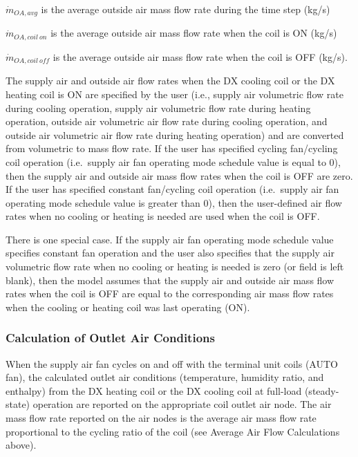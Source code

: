 \(\dot{m}_{OA,avg}\) is the average outside air mass flow rate during the time step (kg/s)

\(\dot{m}_{OA,coil~on}\) is the average outside air mass flow rate when the coil is ON (kg/s)

\(\dot{m}_{OA,coil~off}\) is the average outside air mass flow rate when the coil is OFF (kg/s).

The supply air and outside air flow rates when the DX cooling coil or the DX heating coil is ON are specified by the user (i.e., supply air volumetric flow rate during cooling operation, supply air volumetric flow rate during heating operation, outside air volumetric air flow rate during cooling operation, and outside air volumetric air flow rate during heating operation) and are converted from volumetric to mass flow rate. If the user has specified cycling fan/cycling coil operation (i.e.~supply air fan operating mode schedule value is equal to 0), then the supply air and outside air mass flow rates when the coil is OFF are zero. If the user has specified constant fan/cycling coil operation (i.e.~supply air fan operating mode schedule value is greater than 0), then the user-defined air flow rates when no cooling or heating is needed are used when the coil is OFF.

There is one special case. If the supply air fan operating mode schedule value specifies constant fan operation and the user also specifies that the supply air volumetric flow rate when no cooling or heating is needed is zero (or field is left blank), then the model assumes that the supply air and outside air mass flow rates when the coil is OFF are equal to the corresponding air mass flow rates when the cooling or heating coil was last operating (ON).

\subsubsection{Calculation of Outlet Air Conditions}\label{calculation-of-outlet-air-conditions-2}

When the supply air fan cycles on and off with the terminal unit coils (AUTO fan), the calculated outlet air conditions (temperature, humidity ratio, and enthalpy) from the DX heating coil or the DX cooling coil at full-load (steady-state) operation are reported on the appropriate coil outlet air node. The air mass flow rate reported on the air nodes is the average air mass flow rate proportional to the cycling ratio of the coil (see Average Air Flow Calculations above).


